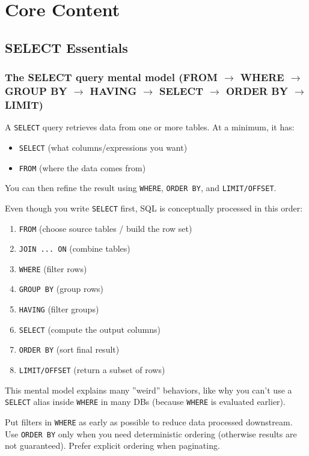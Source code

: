 \section{Core Content}

\subsection{SELECT Essentials}

\subsubsection{The SELECT query mental model (FROM $\rightarrow$ WHERE $\rightarrow$ 
GROUP BY $\rightarrow$ HAVING $\rightarrow$ SELECT $\rightarrow$ ORDER BY $\rightarrow$ LIMIT)}
\J A \texttt{SELECT} query retrieves data from one or more tables. At a minimum, it has:
\begin{itemize}
  \item \texttt{SELECT} (what columns/expressions you want)
  \item \texttt{FROM} (where the data comes from)
\end{itemize}
You can then refine the result using \texttt{WHERE}, \texttt{ORDER BY}, and \texttt{LIMIT/OFFSET}.

\M Even though you write \texttt{SELECT} first, SQL is conceptually processed in this order:
\begin{enumerate}
  \item \texttt{FROM} (choose source tables / build the row set)
  \item \texttt{JOIN ... ON} (combine tables)
  \item \texttt{WHERE} (filter rows)
  \item \texttt{GROUP BY} (group rows)
  \item \texttt{HAVING} (filter groups)
  \item \texttt{SELECT} (compute the output columns)
  \item \texttt{ORDER BY} (sort final result)
  \item \texttt{LIMIT/OFFSET} (return a subset of rows)
\end{enumerate}
This mental model explains many ''weird'' behaviors, like why you can't use a \texttt{SELECT} 
alias inside \texttt{WHERE} in many DBs (because \texttt{WHERE} is evaluated earlier).

\Sx Put filters in \texttt{WHERE} as early as possible to reduce data processed downstream. 
Use \texttt{ORDER BY} only when you need deterministic ordering (otherwise results are not 
guaranteed). Prefer explicit ordering when paginating.

